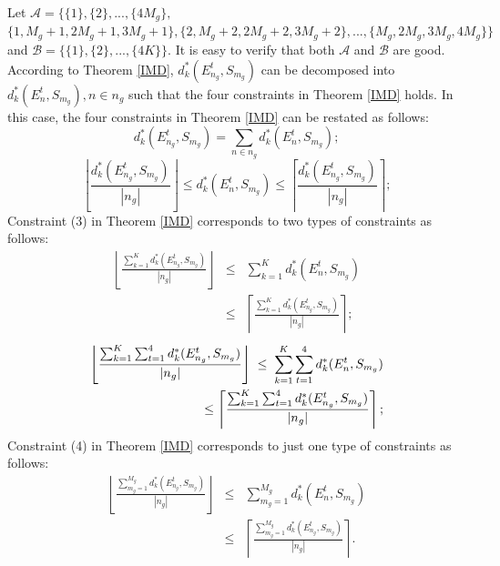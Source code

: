 \documentclass[letterpaper,twocolumn,10pt]{article}
\begin{document}
Let $\mathcal{A} =\{\{1\}, \{2\},..., \{4M_g\},$ $\{1, M_g+1, 2M_g+1, 3M_g+1\}, \{2, M_g+2, 2M_g+2, 3M_g+2\},...,\{M_g, 2M_g, 3M_g, 4M_g\}\}$ and $\mathcal{B} =\{\{1\}, \{2\},..., \{4K\}\}$. It is easy to verify that both $\mathcal{A}$ and $\mathcal{B}$ are good. According to Theorem \ref{IMD}, $d^*_{k}(E_{n_g}^t, S_{m_g})$ can be decomposed into $d^*_{k}(E_{n}^t, S_{m_g}), n\in n_g$ such that the four constraints in Theorem \ref{IMD} holds. In this case, the four constraints in Theorem \ref{IMD} can be restated as follows:
\begin{equation}\label{ImdConstraint1}
d^*_{k}(E_{n_g}^t, S_{m_g})=\sum_{n\in n_g} d^*_{k}(E_{n}^t, S_{m_g});
\end{equation}
\begin{equation}\label{ImdConstraint2}
\left\lfloor \frac{d^*_{k}(E_{n_g}^t, S_{m_g})}{|n_g|}\right\rfloor \leq d^*_{k}(E_{n}^t, S_{m_g}) \leq \left\lceil\frac{d^*_{k}(E_{n_g}^t, S_{m_g})}{|n_g|}\right\rceil;
\end{equation}
Constraint (3) in Theorem \ref{IMD} corresponds to two types of constraints as follows:
\begin{eqnarray}\label{ImdConstraint3}
\left\lfloor \frac{\sum_{k=1}^K d^*_{k}(E_{n_g}^t, S_{m_g})}{|n_g|}\right\rfloor &\leq& \sum_{k=1}^K d^*_{k}(E_{n}^t, S_{m_g})\\
&\leq&\left\lceil\frac{\sum_{k=1}^K d^*_{k}(E_{n_g}^t, S_{m_g})}{|n_g|}\right\rceil;\nonumber
\end{eqnarray}
\begin{eqnarray}\label{ImdConstraint4}
&&\hspace{-8mm}\left\lfloor \frac{\sum_{k=1}^K\sum_{t=1}^4 d^*_{k}(E_{n_g}^t, S_{m_g})}{|n_g|}\right\rfloor\hspace{1mm}\leq\hspace{1mm}\sum_{k=1}^K\sum_{t=1}^4 d^*_{k}(E_{n}^t, S_{m_g}) \\
&&\hspace{28mm}\leq\left\lceil\frac{\sum_{k=1}^K\sum_{t=1}^4 d^*_{k}(E_{n_g}^t, S_{m_g})}{|n_g|}\right\rceil;\nonumber
\end{eqnarray}
Constraint (4) in Theorem \ref{IMD} corresponds to just one type of constraints as follows:
\begin{eqnarray}\label{ImdConstraint5}
\left\lfloor \frac{\sum_{m_g=1}^{M_g} d^*_{k}(E_{n_g}^t, S_{m_g})}{|n_g|}\right\rfloor &\leq& \sum_{m_g=1}^{M_g} d^*_{k}(E_{n}^t, S_{m_g})\\
&\leq& \left\lceil\frac{\sum_{m_g=1}^{M_g} d^*_{k}(E_{n_g}^t, S_{m_g})}{|n_g|}\right\rceil.\nonumber
\end{eqnarray}
\end{document}
